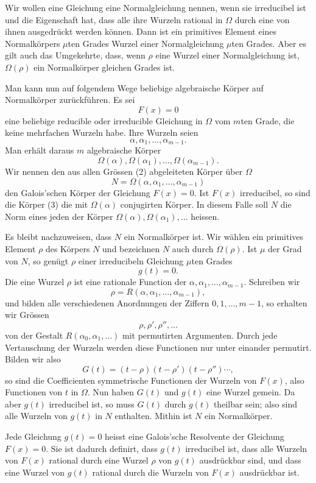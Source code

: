 \documentclass[11pt]{article}
\begin{document}
Wir wollen eine Gleichung eine Normalgleichung nennen, wenn sie irreducibel ist und die Eigenschaft hat, dass alle ihre Wurzeln rational in $\Omega$ durch eine von ihnen ausgedrückt werden können. Dann ist ein primitives Element eines Normalkörpers $\mu$ten Grades Wurzel einer Normalgleichung $\mu$ten Grades. Aber es gilt auch das Umgekehrte, dass, wenn $\rho$ eine Wurzel einer Normalgleichung ist, $\Omega(\rho)$ ein Normalkörper gleichen Grades ist.

Man kann nun auf folgendem Wege beliebige algebraische Körper auf Normalkörper zurückführen. Es sei
\[
\tag{1}
        F(x)=0
\]
eine beliebige reducible oder irreducible Gleichung in $\Omega$ vom $m$ten Grade, die keine mehrfachen Wurzeln habe. Ihre Wurzeln seien
\[
\tag{2}
        \alpha,\alpha_1,\ldots,\alpha_{m-1}.
\]
Man erhält daraus $m$ algebraische Körper
\[
\tag{3}
        \Omega(\alpha),\Omega(\alpha_1),\ldots,\Omega(\alpha_{m-1}).
\]
Wir nennen den aus allen Grössen (2) abgeleiteten Körper über $\Omega$
\[
\tag{4}
        N=\Omega(\alpha,\alpha_1,\ldots,\alpha_{m-1})
\]
den Galois'schen Körper der Gleichung $F(x)=0$. Ist $F(x)$ irreducibel, so sind die Körper (3) die mit $\Omega(\alpha)$ conjugirten Körper. In diesem Falle soll $N$ die Norm eines jeden der Körper $\Omega(\alpha),\Omega(\alpha_1),\ldots$ heissen.

Es bleibt nachzuweisen, dass $N$ ein Normalkörper ist. Wir wählen ein primitives Element $\rho$ des Körpers $N$ und bezeichnen $N$ auch durch $\Omega(\rho)$. Ist $\mu$ der Grad von $N$, so genügt $\rho$ einer irreducibeln Gleichung $\mu$ten Grades
\[
\tag{5}
        g(t)=0.
\]
Die eine Wurzel $\rho$ ist eine rationale Function der $\alpha,\alpha_1,\ldots,\alpha_{m-1}$. Schreiben wir
\[
        \rho=R(\alpha,\alpha_1,\ldots,\alpha_{m-1}),
\]
und bilden alle verschiedenen Anordnungen der Ziffern $0,1,\ldots,m-1$, so erhalten wir Grössen
\[
\tag{7}
        \rho,\rho',\rho'',\ldots
\]
von der Gestalt $R(\alpha_0,\alpha_1,\ldots)$ mit permutirten Argumenten. Durch jede Vertauschung der Wurzeln werden diese Functionen nur unter einander permutirt. Bilden wir also
\[
        G(t)=(t-\rho)(t-\rho')(t-\rho'')\cdots,
\]
so sind die Coefficienten symmetrische Functionen der Wurzeln von $F(x)$, also Functionen von $t$ in $\Omega$. Nun haben $G(t)$ und $g(t)$ eine Wurzel gemein. Da aber $g(t)$ irreducibel ist, so muss $G(t)$ durch $g(t)$ theilbar sein; also sind alle Wurzeln von $g(t)$ in $N$ enthalten. Mithin ist $N$ ein Normalkörper.

Jede Gleichung $g(t)=0$ heisst eine Galois'sche Resolvente der Gleichung $F(x)=0$. Sie ist dadurch definirt, dass $g(t)$ irreducibel ist, dass alle Wurzeln von $F(x)$ rational durch eine Wurzel $\rho$ von $g(t)$ ausdrückbar sind, und dass eine Wurzel von $g(t)$ rational durch die Wurzeln von $F(x)$ ausdrückbar ist.
\end{document}
